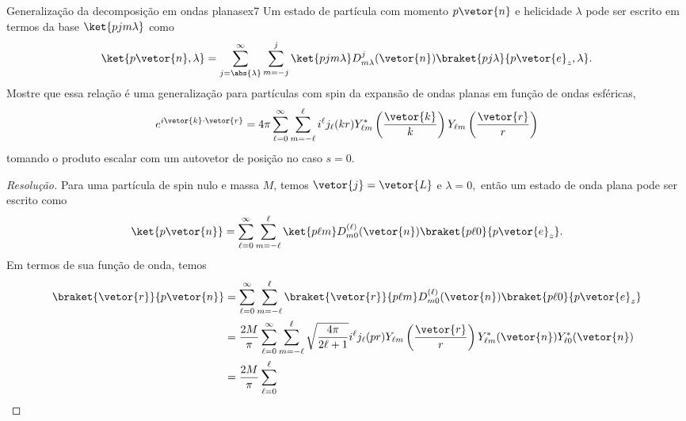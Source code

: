\begin{exercício}{Generalização da decomposição em ondas planas}{ex7}
    Um estado de partícula com momento \(p\vetor{n}\) e helicidade \(\lambda\) pode ser escrito em termos da base \(\ket{pjm \lambda}\) como
    \begin{equation*}
        \ket{p\vetor{n}, \lambda} = \sum_{j = \abs{\lambda}}^\infty \sum_{m = -j}^{j} \ket{pjm \lambda} D_{m \lambda}^j(\vetor{n}) \braket{pj \lambda}{p \vetor{e}_z, \lambda}.
    \end{equation*}
    Mostre que essa relação é uma generalização para partículas com spin da expansão de ondas planas em função de ondas esféricas,
    \begin{equation*}
        e^{i \vetor{k}\cdot \vetor{r}} = 4\pi \sum_{\ell = 0}^{\infty} \sum_{m = -\ell}^{\ell} i^\ell j_{\ell}(k r) Y_{\ell m}^*\left(\frac{\vetor{k}}{k}\right) Y_{\ell m}\left(\frac{\vetor{r}}{r}\right)
    \end{equation*}
    tomando o produto escalar com um autovetor de posição no caso \(s = 0.\)
\end{exercício}
\begin{proof}[Resolução]
    Para uma partícula de spin nulo e massa \(M\), temos \(\vetor{j} = \vetor{L}\) e \(\lambda = 0,\) então um estado de onda plana pode ser escrito como
    \begin{equation*}
        \ket{p\vetor{n}} = \sum_{\ell = 0}^\infty \sum_{m = -\ell}^{\ell} \ket{p\ell m}D^{(\ell)}_{m0}(\vetor{n})\braket{p\ell0}{p\vetor{e}_z}.
    \end{equation*}
    Em termos de sua função de onda, temos
    \begin{align*}
        \braket{\vetor{r}}{p\vetor{n}} &= \sum_{\ell = 0}^\infty \sum_{m = - \ell}^{\ell} \braket{\vetor{r}}{p\ell m} D^{(\ell)}_{m0}(\vetor{n}) \braket{p \ell 0}{p\vetor{e}_z}\\
                                       &= \frac{2M}{\pi}\sum_{\ell = 0}^\infty \sum_{m = -\ell}^{\ell} \sqrt{\frac{4\pi}{2\ell + 1}}i^{\ell} j_{\ell}(p r) Y_{\ell m}\left(\frac{\vetor{r}}{r}\right)Y_{\ell m}^*(\vetor{n}) Y_{\ell 0}^*(\vetor{n})\\
                                       &= \frac{2M}{\pi} \sum_{\ell = 0}^\ell
    \end{align*}
\end{proof}
